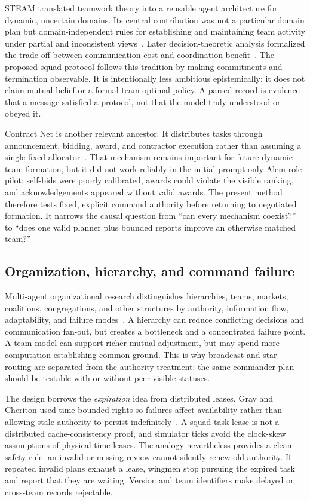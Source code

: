 \documentclass[11pt]{article}
\begin{document}
STEAM translated teamwork theory into a reusable agent architecture for dynamic,
uncertain domains.  Its central contribution was not a particular domain plan but
domain-independent rules for establishing and maintaining team activity under
partial and inconsistent views~\citep{tambe1997steam}.  Later decision-theoretic
analysis formalized the trade-off between communication cost and coordination
benefit~\citep{nair2005team}.  The proposed squad protocol follows this tradition
by making commitments and termination observable.  It is intentionally less
ambitious epistemically: it does not claim mutual belief or a formal team-optimal
policy.  A parsed record is evidence that a message satisfied a protocol, not that
the model truly understood or obeyed it.

Contract Net is another relevant ancestor.  It distributes tasks through
announcement, bidding, award, and contractor execution rather than assuming a
single fixed allocator~\citep{smith1980contractnet}.  That mechanism remains
important for future dynamic team formation, but it did not work reliably in the
initial prompt-only Alem role pilot: self-bids were poorly calibrated, awards
could violate the visible ranking, and acknowledgements appeared without valid
awards.  The present method therefore tests fixed, explicit command authority
before returning to negotiated formation.  It narrows the causal question from
``can every mechanism coexist?'' to ``does one valid planner plus bounded reports
improve an otherwise matched team?''

\subsection{Organization, hierarchy, and command failure}

Multi-agent organizational research distinguishes hierarchies, teams, markets,
coalitions, congregations, and other structures by authority, information flow,
adaptability, and failure modes~\citep{horling2004organizations}.  A hierarchy can
reduce conflicting decisions and communication fan-out, but creates a bottleneck
and a concentrated failure point.  A team model can support richer mutual
adjustment, but may spend more computation establishing common ground.  This is
why broadcast and star routing are separated from the authority treatment: the
same commander plan should be testable with or without peer-visible statuses.

The design borrows the \emph{expiration} idea from distributed leases.  Gray and
Cheriton used time-bounded rights so failures affect availability rather than
allowing stale authority to persist indefinitely~\citep{gray1989leases}.  A squad
task lease is not a distributed cache-consistency proof, and simulator ticks avoid
the clock-skew assumptions of physical-time leases.  The analogy nevertheless
provides a clean safety rule: an invalid or missing review cannot silently renew
old authority.  If repeated invalid plans exhaust a lease, wingmen stop pursuing
the expired task and report that they are waiting.  Version and team identifiers
make delayed or cross-team records rejectable.
\end{document}
